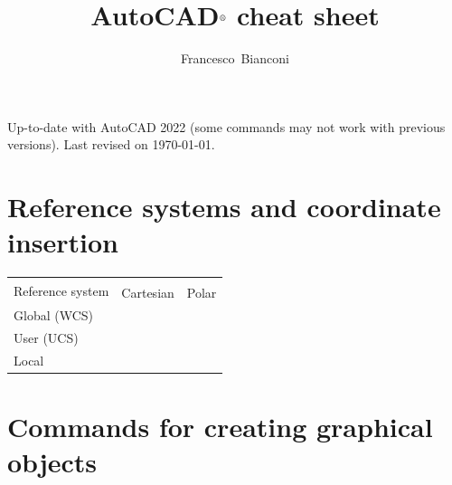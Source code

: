 \documentclass[..]{../IEEEphot}
\begin{document}
\title{AutoCAD$^{\text{\textregistered}}$ cheat sheet}

\author{Francesco~Bianconi}


\maketitle
%
%
\thispagestyle{empty}

\vspace{-1.0cm}
\noindent Up-to-date with AutoCAD 2022 (some commands may not work with previous versions). Last revised on \today.

\tableofcontents

\clearpage

\section{Reference systems and coordinate insertion}
\begin{longtable}{m{.3\linewidth}>{\centering\arraybackslash}p{.3\linewidth}>{\centering\arraybackslash}p{.3\linewidth}}
\toprule
\multirow{2}{*}{Reference system} & \multicolumn{2}{c}{Insertion mode} \\
\cmidrule{2-3}
 & Cartesian & Polar \\
\midrule
Global (WCS) & \multicolumn{1}{c}{*$x$,$y$} & \multicolumn{1}{c}{*$\rho<\theta$} \\
User (UCS) & \multicolumn{1}{c}{$x$,$y$} & \multicolumn{1}{c}{$\rho<\theta$} \\
Local & \multicolumn{1}{c}{@$x$,$y$} & \multicolumn{1}{c}{@$\rho<\theta$} \\
\bottomrule
\end{longtable}

\section{Commands for creating graphical objects}
\end{document}
